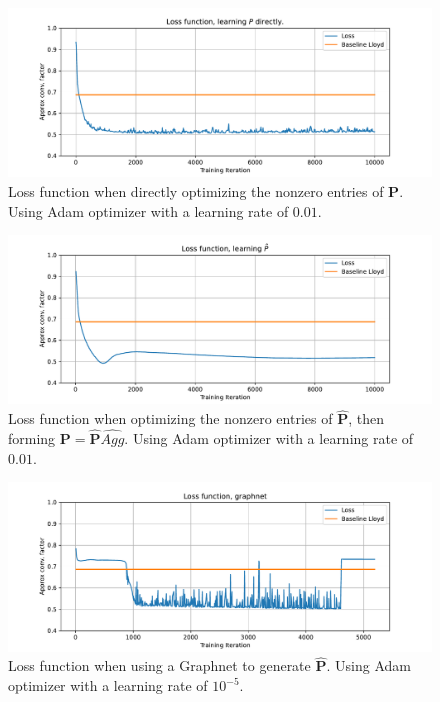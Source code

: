 \documentclass{article}
\newcommand{\mat}[1]{\bm{{#1}}}
\begin{document}
\begin{figure}[h]
  \includegraphics[width=\textwidth]{figures/learn_p_directly.pdf}
  \caption{Loss function when directly optimizing the nonzero entries of $\mat{P}$.  Using Adam optimizer with a learning rate of $0.01$.}
  \label{fig:loss_p}
\end{figure}

\begin{figure}[h]
  \includegraphics[width=\textwidth]{figures/learn_p_hat.pdf}
  \caption{Loss function when optimizing the nonzero entries of $\mat{\hat{P}}$, then forming $\mat{P}=\mat{\hat{P}}\hat{Agg}$.  Using Adam optimizer with a learning rate of $0.01$.}
  \label{fig:loss_p_hat}
\end{figure}

\begin{figure}[h]
  \includegraphics[width=\textwidth]{figures/learn_graphnet.pdf}
  \caption{Loss function when using a Graphnet to generate $\mat{\hat{P}}$.  Using Adam optimizer with a learning rate of $10^{-5}$.}
  \label{fig:loss_graphnet}
\end{figure}
\end{document}
